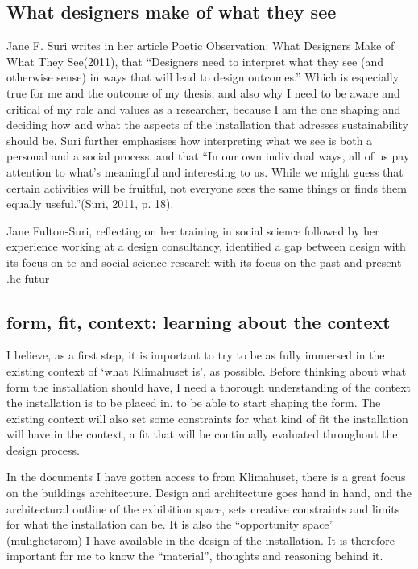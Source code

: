 \subsection{What designers make of what they see}
Jane F. Suri writes in her article Poetic Observation: What Designers Make of What They See(2011), that “Designers need to interpret what they see (and otherwise sense) in ways that will lead to design outcomes.” Which is especially true for me and the outcome of my thesis, and also why I need to be aware and critical of my role and values as a researcher, because  I am the one shaping and deciding how and what the aspects of the installation that adresses sustainability should be. Suri further emphasises how interpreting what we see is both a personal and a social process, and that “In our own individual ways, all of us pay attention to what’s meaningful and interesting to us. While we might guess that certain activities will be fruitful, not everyone sees the same things or finds them equally useful.”(Suri, 2011, p. 18).

Jane Fulton-Suri, reflecting on her training in social science followed by her experience working at a design consultancy, identified a gap between design with its focus on te and social science research with its focus on the past and present \autocite[p. 167]{zimmerman_research_2014}.he futur



\subsection{form, fit, context: learning about the context }
I believe, as a first step, it is important to try to be as fully immersed in the existing context of ‘what Klimahuset is’, as possible. Before thinking about what form the installation should have, I need a thorough understanding of the context the installation is to be placed in, to be able to start shaping the form. The existing context will also set some constraints for what kind of fit the installation will have in the context, a fit that will be continually evaluated throughout the design process. 

In the documents I have gotten access to from Klimahuset, there is a great focus on the buildings architecture. Design and architecture goes hand in hand, and the architectural outline of the exhibition space, sets creative constraints and limits for what the installation can be. It is also the “opportunity space” (mulighetsrom) I have available in the design of the installation. It is therefore important for me to know the “material”, thoughts and reasoning behind it.


